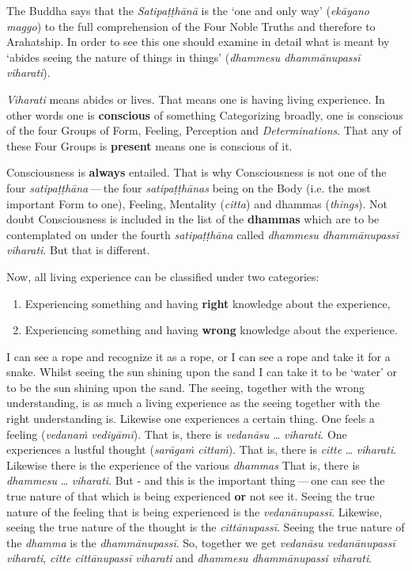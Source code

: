 The Buddha says that the \emph{Satipaṭṭhānā} is the `one and only way' (\emph{ekāyano maggo}) to the full comprehension of the Four Noble Truths and therefore to Arahatship. In order to see this one should examine in detail what is meant by `abides seeing the nature of things in things' (\emph{dhammesu dhammānupassī viharati}).

\emph{Viharati} means abides or lives. That means one is having living experience. In other words one is \textbf{conscious} of something Categorizing broadly, one is conscious of the four Groups of Form, Feeling, Perception and \emph{Determinations}. That any of these Four Groups is \textbf{present} means one is conscious of it.

Consciousness is \textbf{always} entailed. That is why Consciousness is not one of the four \emph{satipaṭṭhāna} --- the four \emph{satipaṭṭhānas} being on the Body (i.e. the most important Form to one), Feeling, Mentality (\emph{citta}) and dhammas (\emph{things}). Not doubt Consciousness is included in the list of the \textbf{dhammas} which are to be contemplated on under the fourth \emph{satipaṭṭhāna} called \emph{dhammesu dhammānupassī viharati}. But that is different.

Now, all living experience can be classified under two categories:

\begin{enumerate}
\def\labelenumi{\arabic{enumi}.}
\item
  Experiencing something and having \textbf{right} knowledge about the experience,
\item
  Experiencing something and having \textbf{wrong} knowledge about the experience.
\end{enumerate}

I can see a rope and recognize it as a rope, or I can see a rope and take it for a snake. Whilst seeing the sun shining upon the sand I can take it to be `water' or to be the sun shining upon the sand. The seeing, together with the wrong understanding, is as much a living experience as the seeing together with the right understanding is. Likewise one experiences a certain thing. One feels a feeling (\emph{vedanaṁ vediyāmī}). That is, there is \emph{vedanāsu} \ldots\hspace{0pt} \emph{viharati}. One experiences a lustful thought (\emph{sarāgaṁ cittaṁ}). That is, there is \emph{citte} \ldots\hspace{0pt} \emph{viharati}. Likewise there is the experience of the various \emph{dhammas} That is, there is \emph{dhammesu} \ldots\hspace{0pt} \emph{viharati}. But - and this is the important thing --- one can see the true nature of that which is being experienced \textbf{or} not see it. Seeing the true nature of the feeling that is being experienced is the \emph{vedanānupassī}. Likewise, seeing the true nature of the thought is the \emph{cittānupassī}. Seeing the true nature of the \emph{dhamma} is the \emph{dhammānupassī}. So, together we get \emph{vedanāsu vedanānupassī viharati}, \emph{citte cittānupassī viharati} and \emph{dhammesu dhammānupassi viharati}.

